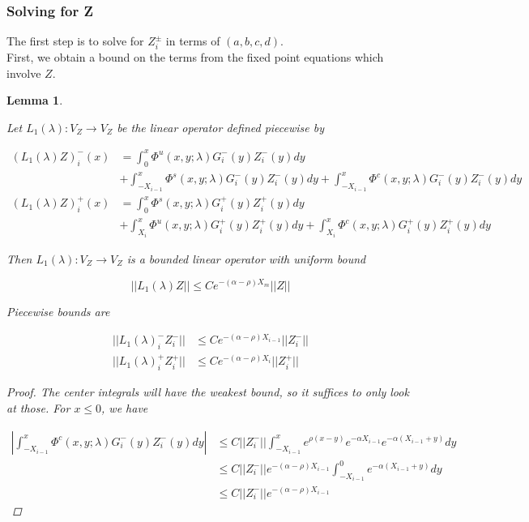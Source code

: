 \documentclass[12pt]{article}
\newtheorem{lemma}{Lemma}
\begin{document}
\subsubsection*{Solving for Z}

The first step is to solve for $Z_i^\pm$ in terms of $(a, b, c, d)$.\\

First, we obtain a bound on the terms from the fixed point equations which involve $Z$. 


\begin{lemma}\label{L1}

Let $L_1(\lambda): V_Z \rightarrow V_Z$ be the linear operator defined piecewise by

\begin{align*}
(L_1(\lambda)Z)_i^-(x) &= \int_0^x \Phi^u(x, y; \lambda) G_i^-(y)Z_i^-(y) dy \\
&+ \int_{-X_{i-1}}^x \Phi^s(x, y; \lambda) G_i^-(y)Z_i^-(y) dy 
+ \int_{-X_{i-1}}^x \Phi^c(x, y; \lambda) G_i^-(y)Z_i^-(y) dy \\ 
(L_1(\lambda)Z)_i^+(x) &= \int_0^x \Phi^s(x, y; \lambda) G_i^+(y)Z_i^+(y) dy \\
&+ \int_{X_i}^x \Phi^u(x, y; \lambda) G_i^+(y)Z_i^+(y) dy
+ \int_{X_i}^x \Phi^c(x, y; \lambda) G_i^+(y)Z_i^+(y) dy 
\end{align*}

Then $L_1(\lambda): V_Z \rightarrow V_Z$ is a bounded linear operator with uniform bound

\begin{equation}\label{L1bound2}
||L_1(\lambda)Z|| \leq C e^{-(\alpha - \rho )X_m} ||Z||
\end{equation}

Piecewise bounds are

\begin{align*}
||L_1(\lambda)_i^- Z_i^-|| &\leq C e^{-(\alpha - \rho )X_{i-1}} ||Z_i^-|| \\
||L_1(\lambda)_i^+ Z_i^+|| &\leq C e^{-(\alpha - \rho )X_i} ||Z_i^+||
\end{align*}

\begin{proof}
The center integrals will have the weakest bound, so it suffices to only look at those. For $x \leq 0$, we have 

\begin{align*}
\left| \int_{-X_{i-1}}^x \Phi^c(x, y; \lambda) G_i^-(y)Z_i^-(y) dy \right| 
&\leq C ||Z_i^-|| \int_{-X_{i-1}}^x e^{\rho (x - y)} e^{-\alpha X_{i-1}} e^{-\alpha(X_{i-1} + y) } dy \\
&\leq C ||Z_i^-|| e^{-(\alpha - \rho) X_{i-1}} \int_{-X_{i-1}}^0  e^{-\alpha(X_{i-1} + y) } dy \\
&\leq C ||Z_i^-|| e^{-(\alpha - \rho) X_{i-1}} 
\end{align*}


\end{proof}
\end{lemma}
\end{document}
